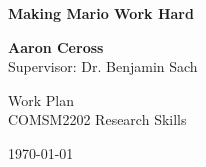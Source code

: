 \documentclass[a4paper]{article}
\begin{document}



\begin{titlepage}
    \begin{center}
        \vspace*{4cm}

        \Huge\textbf{Making Mario Work Hard}


        \vspace{2.5cm}

       \Large\textbf{Aaron Ceross}
       \\Supervisor: Dr. Benjamin Sach

        \vspace{0.8cm}

        Work Plan\\
        COMSM2202 Research Skills

        \vspace{0.8cm}
        \vspace{0.8cm}


        \today

    \end{center}
\end{titlepage}



\tableofcontents

\pagebreak

\end{document}
